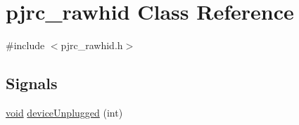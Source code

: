 \hypertarget{classpjrc__rawhid}{\section{pjrc\-\_\-rawhid \-Class \-Reference}
\label{classpjrc__rawhid}
}


{\ttfamily \#include $<$pjrc\-\_\-rawhid.\-h$>$}

\subsection*{\-Signals}
\begin{DoxyCompactItemize}
\item 
\hyperlink{group___u_a_v_objects_plugin_ga444cf2ff3f0ecbe028adce838d373f5c}{void} \hyperlink{group___raw_h_i_d_plugin_ga214c3f073c411ac80306d36644715d8c}{device\-Unplugged} (int)
\end{DoxyCompactItemize}
